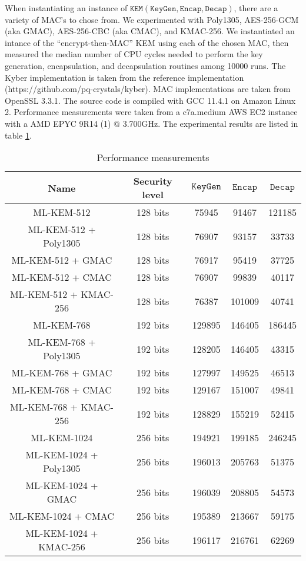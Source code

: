 \documentclass[floatrow,journal=tches,submission]{iacrtrans}
\newcommand{\keygen}{\texttt{KeyGen}}
\newcommand{\kem}{\texttt{KEM}}
\newcommand{\encap}{\texttt{Encap}}
\newcommand{\decap}{\texttt{Decap}}
\begin{document}
When instantiating an instance of $\kem(\keygen, \encap, \decap)$, there are a variety of MAC's to chose from. We experimented with Poly1305, AES-256-GCM (aka GMAC), AES-256-CBC (aka CMAC), and KMAC-256. We instantiated an intance of the ``encrypt-then-MAC'' KEM using each of the chosen MAC, then measured the median number of CPU cycles needed to perform the key generation, encapsulation, and decapsulation routines among 10000 runs. The Kyber implementation is taken from the reference implementation (https://github.com/pq-crystals/kyber). MAC implementations are taken from OpenSSL 3.3.1. The source code is compiled with GCC 11.4.1 on Amazon Linux 2. Performance measurements were taken from a c7a.medium AWS EC2 instance with a AMD EPYC 9R14 (1) @ 3.700GHz. The experimental results are listed in table \ref{tbl:kyber-ae-perf}.

\begin{table}[H]
    \centering
    \begin{tabular}{|c|c|c|c|c|}
        \hline
        Name & Security level & $\keygen$ & $\encap$ & $\decap$ \\
        \hline
        ML-KEM-512 & 128 bits & 75945 & 91467& 121185 \\
        \hline
        ML-KEM-512 + Poly1305& 128 bits & 76907 & 93157 & 33733 \\
        \hline
        ML-KEM-512 + GMAC& 128 bits & 76917 & 95419 & 37725 \\
        \hline
        ML-KEM-512 + CMAC& 128 bits & 76907 & 99839 & 40117 \\
        \hline
        ML-KEM-512 + KMAC-256& 128 bits & 76387 & 101009 & 40741 \\
        \hline
        ML-KEM-768 & 192 bits & 129895 & 146405& 186445 \\
        \hline
        ML-KEM-768 + Poly1305& 192 bits & 128205 & 146405& 43315 \\
        \hline
        ML-KEM-768 + GMAC& 192 bits & 127997 & 149525 & 46513 \\
        \hline
        ML-KEM-768 + CMAC& 192 bits & 129167 & 151007 & 49841 \\
        \hline
        ML-KEM-768 + KMAC-256& 192 bits & 128829 & 155219 & 52415 \\
        \hline
        ML-KEM-1024 & 256 bits & 194921 & 199185 & 246245 \\
        \hline
        ML-KEM-1024 + Poly1305& 256 bits & 196013 & 205763 & 51375 \\
        \hline
        ML-KEM-1024 + GMAC& 256 bits & 196039 & 208805 & 54573 \\
        \hline
        ML-KEM-1024 + CMAC& 256 bits & 195389 & 213667 & 59175 \\
        \hline
        ML-KEM-1024 + KMAC-256& 256 bits & 196117 & 216761 & 62269 \\
        \hline
    \end{tabular}
    \caption{Performance measurements}\label{tbl:kyber-ae-perf}
\end{table}
\end{document}
